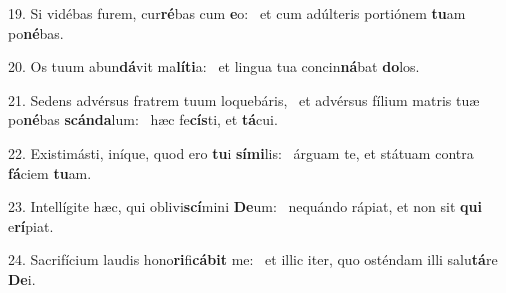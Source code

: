 19. Si vidébas furem, cur\textbf{ré}bas cum \textbf{e}o: \ast\  et cum adúlteris portiónem \textbf{tu}am po\textbf{né}bas.\

20. Os tuum abun\textbf{dá}vit ma\textbf{lí}\textbf{ti}a: \ast\  et lingua tua concin\textbf{ná}bat \textbf{do}los.\

21. Sedens advérsus fratrem tuum loquebáris, \dag\  et advérsus fílium matris tuæ po\textbf{né}bas \textbf{scán}\textbf{da}lum: \ast\  hæc fe\textbf{cís}ti, et \textbf{tá}cui.\

22. Existimásti, iníque, quod ero \textbf{tu}i \textbf{sí}\textbf{mi}lis: \ast\  árguam te, et státuam contra \textbf{fá}ciem \textbf{tu}am.\

23. Intellígite hæc, qui oblivi\textbf{scí}mini \textbf{De}um: \ast\  nequándo rápiat, et non sit \textbf{qui} e\textbf{rí}piat.\

24. Sacrifícium laudis hono\textbf{ri}fi\textbf{cá}\textbf{bit} me: \ast\  et illic iter, quo osténdam illi salu\textbf{tá}re \textbf{De}i.\

